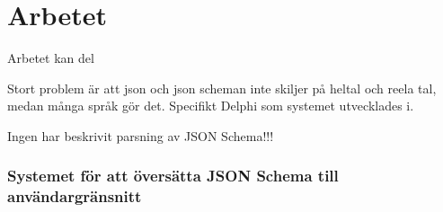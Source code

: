 \chapter{Arbetet}
Arbetet kan del


Stort problem är att json och json scheman inte skiljer på heltal och reela tal, medan många språk gör det. Specifikt Delphi som systemet utvecklades i.

Ingen har beskrivit parsning av JSON Schema!!!

\subsection{Systemet för att översätta JSON Schema till användargränsnitt}

